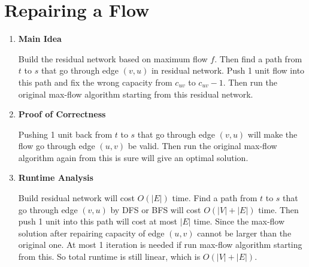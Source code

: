 \documentclass[11pt]{article}
\newenvironment{qparts}{\begin{enumerate}[{(}a{)}]}{\end{enumerate}}
\begin{document}
\section{Repairing a Flow}
\begin{qparts}
	\item \textbf{Main Idea}
	
	Build the residual network based on maximum flow $f$. Then find a path from $t$ to $s$ that go through edge $(v, u)$ in residual network. Push 1 unit flow into this path and fix the wrong capacity from $c_{uv}$ to $c_{uv} - 1$. Then run the original max-flow algorithm starting from this residual network.

	\item \textbf{Proof of Correctness}
	
	Pushing 1 unit back from $t$ to $s$ that go through edge $(v, u)$ will make the flow go through edge $(u, v)$ be valid. Then run the original max-flow algorithm again from this is sure will give an optimal solution.
	
	\item \textbf{Runtime Analysis}
	
	Build residual network will cost $O(|E|)$ time. Find a path from $t$ to $s$ that go through edge $(v, u)$ by DFS or BFS will cost $O(|V| + |E|)$ time. Then push 1 unit into this path will cost at most $|E|$ time. Since the max-flow solution after repairing capacity of edge $(u, v)$ cannot be larger than the original one. At most 1 iteration is needed if run max-flow algorithm starting from this. So total runtime is still linear, which is $O(|V| + |E|)$.

\end{qparts}

\newpage
\end{document}
